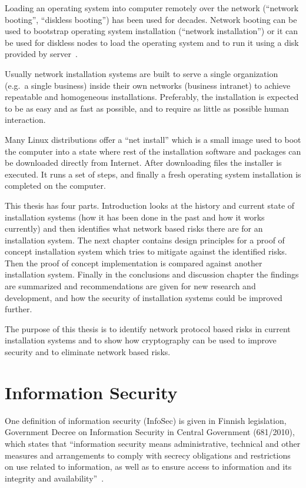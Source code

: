 
Loading an operating system into computer remotely over the network
(``network booting'', ``diskless booting'') has been used for
decades. Network booting can be used to bootstrap operating system
installation (``network installation'') or it can be used for diskless
nodes to load the operating system and to run it using a disk provided
by server~\cite{anvin2008x86}.

Usually network installation systems are built to serve a single
organization (e.g.\ a single business) inside their own networks
(business intranet) to achieve repeatable and homogeneous
installations. Preferably, the installation is expected to be as easy
and as fast as possible, and to require as little as possible human
interaction.

Many Linux distributions offer a ``net install'' which is a small
image used to boot the computer into a state where rest of the
installation software and packages can be downloaded directly from
Internet. After downloading files the installer is executed. It runs a
set of steps, and finally a fresh operating system installation is
completed on the computer.

This thesis has four parts. Introduction looks at the history and
current state of installation systems (how it has been done in the
past and how it works currently) and then identifies what network
based risks there are for an installation system. The next chapter
contains design principles for a proof of concept installation system
which tries to mitigate against the identified risks. Then the proof
of concept implementation is compared against another installation
system. Finally in the conclusions and discussion chapter the findings
are summarized and recommendations are given for new research and
development, and how the security of installation systems could be
improved further.

The purpose of this thesis is to identify network protocol based risks
in current installation systems and to show how cryptography can be
used to improve security and to eliminate network based risks.


\section{Information Security}

One definition of information security (InfoSec) is given in Finnish
legislation, Government Decree on Information Security in Central
Government (681/2010), which states that ``information security means
administrative, technical and other measures and arrangements to
comply with secrecy obligations and restrictions on use related to
information, as well as to ensure access to information and its
integrity and availability''~\cite{finlex-infosec-in-gov}.

